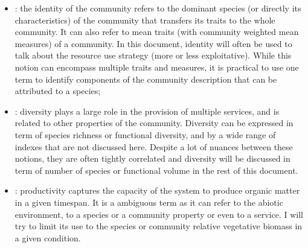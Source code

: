 \begin{itemize}
\item {}: the identity of the community refers to the dominant species (or directly its characteristics) of the community that transfers its traits to the whole community. It can also refer to mean traits (with community weighted mean measures) of a community. In this document, identity will often be used to talk about the resource use strategy (more or less exploitative). While this notion can encompass multiple traits and measures, it is practical to use one term to identify components of the community description that can be attributed to a species;
\item {}: diversity plays a large role in the provision of multiple services, and is related to other properties of the community. Diversity can be expressed in term of species richness or functional diversity, and by a wide range of indexes that are not discussed here. Despite a lot of nuances between these notions, they are often tightly correlated and diversity will be discussed in term of number of species or functional volume in the rest of this document.
\item {}: productivity captures the capacity of the system to produce organic matter in a given timespan. It is a ambiguous term as it can refer to the abiotic environment, to a species or a community property or even to a service. I will try to limit its use to the species or community relative vegetative biomass in a given condition.
\end{itemize}


